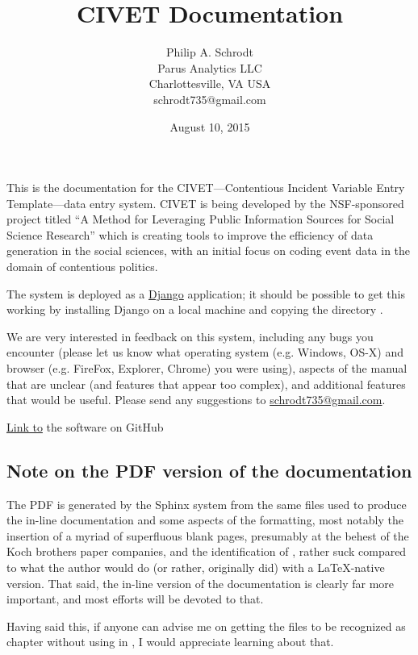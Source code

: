 \documentclass[letterpaper,10pt,english]{sphinxmanual}
\title{CIVET Documentation}
\date{August 10, 2015}
\author{Philip A. Schrodt\\Parus Analytics LLC\\Charlottesville, VA USA\\schrodt735@gmail.com}
\begin{document}
\maketitle
\tableofcontents
{}\label{index::doc}


This is the documentation for the CIVET—Contentious Incident Variable Entry Template—data entry system. CIVET is being developed by the NSF-sponsored project titled “A Method for Leveraging Public Information Sources for Social Science Research” which is creating tools to improve the efficiency of data generation in the social sciences, with an initial focus on coding event data in the domain of contentious politics.

The system is deployed as a \href{https://www.djangoproject.com/start/overview/}{Django} application; it should be possible to get this working by installing Django on a local machine and copying the directory .

We are very interested in feedback on this system, including any bugs
you encounter (please let us know what operating system (e.g. Windows,
OS-X) and browser (e.g. FireFox, Explorer, Chrome) you were using),
aspects of the manual that are unclear (and features that appear too
complex), and additional features that would be useful. Please send any
suggestions to \href{mailto:schrodt735@gmail.com}{schrodt735@gmail.com}.

\href{https://github.com/civet-software}{Link to} the software on GitHub
\subsection*{Note on the PDF version of the documentation}
The PDF is generated by the Sphinx system from the same files used to produce the
in-line documentation and some aspects of the formatting, most notably the insertion
of a myriad of superfluous blank pages, presumably at the behest of the Koch brothers
paper companies, and the identification of , rather suck compared to what
the author would do (or rather, originally did) with a LaTeX-native version. That
said, the in-line version of the documentation is clearly far more important, and
most efforts will be devoted to that.

Having said this, if anyone can advise me on getting the files to be recognized
as chapter without using  in , I would
appreciate learning about that.
\end{document}

